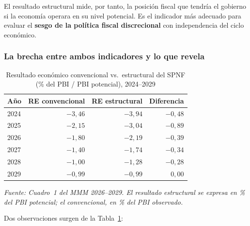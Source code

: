 \documentclass[12pt, a4paper]{article}
\newcommand{\emp}[1]{\textbf{#1}}
\newcommand{\nota}[1]{\textit{\small #1}}
\begin{document}
El resultado estructural mide, por tanto, la posición fiscal que tendría el
gobierno si la economía operara en su nivel potencial. Es el indicador más
adecuado para evaluar el \emp{sesgo de la política fiscal discrecional} con
independencia del ciclo económico.

\subsubsection*{La brecha entre ambos indicadores y lo que revela}

\begin{table}[h!]
\centering
\caption{Resultado económico convencional vs.\ estructural del SPNF
         (\% del PBI / PBI potencial), 2024--2029}
\label{tab:estructural}
\setlength{\tabcolsep}{9pt}
\renewcommand{\arraystretch}{1.25}
\begin{tabular}{lrrr}
\toprule
\rowcolor{headgray}
\textbf{Año} &
\textbf{RE convencional} &
\textbf{RE estructural} &
\textbf{Diferencia} \\
\midrule
2024 & $-3{,}46$ & $-3{,}94$ & $-0{,}48$ \\
\rowcolor{rowgray}
2025 & $-2{,}15$ & $-3{,}04$ & $-0{,}89$ \\
2026 & $-1{,}80$ & $-2{,}19$ & $-0{,}39$ \\
\rowcolor{rowgray}
2027 & $-1{,}40$ & $-1{,}74$ & $-0{,}34$ \\
2028 & $-1{,}00$ & $-1{,}28$ & $-0{,}28$ \\
\rowcolor{rowgray}
2029 & $-0{,}99$ & $-0{,}99$ & $\phantom{-}0{,}00$ \\
\bottomrule
\end{tabular}
\smallskip

\nota{Fuente: Cuadro~1 del MMM 2026--2029. El resultado estructural se expresa
en \% del PBI potencial; el convencional, en \% del PBI observado.}
\end{table}

Dos observaciones surgen de la Tabla~\ref{tab:estructural}:
\end{document}
